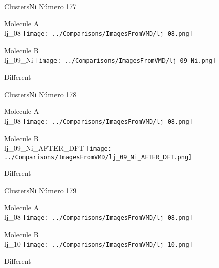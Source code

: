  \newpage

\vtab[-3cm]
\begin{center}
{\large ClustersNi \tab Número 177}
\end{center}
\begin{multicols}{2}
\begin{center}
Molecule A \\ 
lj\_08
\texttt{[image: ../Comparisons/ImagesFromVMD/lj\_08.png]}
\\
\vtab

\columnbreak
Molecule B \\ 
lj\_09\_Ni
\texttt{[image: ../Comparisons/ImagesFromVMD/lj\_09\_Ni.png]}
\\
\vtab


\end{center}
\end{multicols}
\begin{center}
\textcolor{NavyBlue}{\Large Different}
\end{center}

 \newpage

\vtab[-3cm]
\begin{center}
{\large ClustersNi \tab Número 178}
\end{center}
\begin{multicols}{2}
\begin{center}
Molecule A \\ 
lj\_08
\texttt{[image: ../Comparisons/ImagesFromVMD/lj\_08.png]}
\\
\vtab

\columnbreak
Molecule B \\ 
lj\_09\_Ni\_AFTER\_DFT
\texttt{[image: ../Comparisons/ImagesFromVMD/lj\_09\_Ni\_AFTER\_DFT.png]}
\\
\vtab


\end{center}
\end{multicols}
\begin{center}
\textcolor{NavyBlue}{\Large Different}
\end{center}

 \newpage

\vtab[-3cm]
\begin{center}
{\large ClustersNi \tab Número 179}
\end{center}
\begin{multicols}{2}
\begin{center}
Molecule A \\ 
lj\_08
\texttt{[image: ../Comparisons/ImagesFromVMD/lj\_08.png]}
\\
\vtab

\columnbreak
Molecule B \\ 
lj\_10
\texttt{[image: ../Comparisons/ImagesFromVMD/lj\_10.png]}
\\
\vtab


\end{center}
\end{multicols}
\begin{center}
\textcolor{NavyBlue}{\Large Different}
\end{center}

